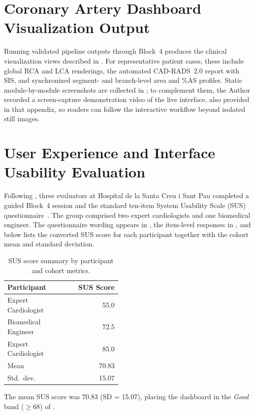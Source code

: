 \section{Coronary Artery Dashboard Visualization Output}
\label{sec:results-dashboard}

Running validated pipeline outputs through Block~4 produces the clinical visualization views described in . For representative patient cases, these include global RCA and LCA renderings, the automated CAD-RADS~2.0 report with SIS, and synchronized segment- and branch-level area and \%AS profiles. Static module-by-module screenshots are collected in ; to complement them, the Author recorded a screen-capture demonstration video of the live interface, also provided in that appendix, so readers can follow the interactive workflow beyond isolated still images.

\section{User Experience and Interface Usability Evaluation}
\label{sec:results-ux}

Following , three evaluators at Hospital de la Santa Creu i Sant Pau completed a guided Block~4 session and the standard ten-item System Usability Scale (SUS) questionnaire~\cite{brooke1996}. The group comprised two expert cardiologists and one biomedical engineer. The questionnaire wording appears in , the item-level responses in , and  below lists the converted SUS score for each participant together with the cohort mean and standard deviation.

\begin{table}[H]
  \caption{SUS score summary by participant and cohort metrics.}
  \label{tab:sus-summary}
  \vspace{0.5em}
  \centering
  \small
  \renewcommand{\arraystretch}{1.35}
  \setlength{\tabcolsep}{6pt}
  \begin{tabular}{@{}>{\raggedright\arraybackslash}p{0.46\linewidth}r@{}}
    \toprule
    \cellcolor{gray!12}\textbf{Participant} &
    \cellcolor{gray!12}\textbf{SUS Score} \\
    \midrule
    Expert Cardiologist & 55.0 \\
    Biomedical Engineer & 72.5 \\
    Expert Cardiologist & 85.0 \\
    \midrule
    Mean & 70.83 \\
    Std.\ dev. & 15.07 \\
    \bottomrule
  \end{tabular}
\end{table}

The mean SUS score was 70.83 (SD = 15.07), placing the dashboard in the \emph{Good} band ($\geq$68) of .

\setlength{\parskip}{0pt plus 1pt}
\setlength{\parindent}{15pt}
